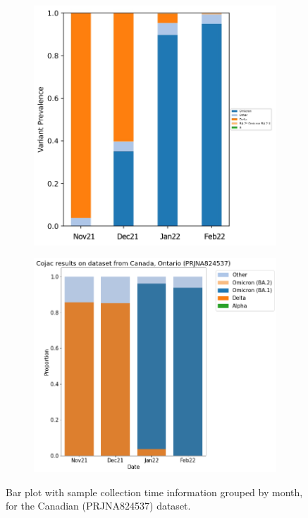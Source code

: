     \begin{figure}[H]
        \centering
        \begin{subfigure}[b]{0.5\textwidth}
        \includegraphics[width=1\textwidth]{figures/results/real/ca-freyja-monthly.png}
        \label{fig:results:real:ca-freyja-monthly}
        \end{subfigure}
        \hfill
        \begin{subfigure}[b]{0.6\textwidth}
        \includegraphics[width=1\textwidth]{figures/results/real/ca-cojac-monthly.png}
        \label{fig:results:real:ca-cojac-monthly}
        \end{subfigure}
        \hfill
        \caption{Bar plot with sample collection time information grouped by month, for the Canadian (PRJNA824537) dataset.}
    \end{figure}
    
